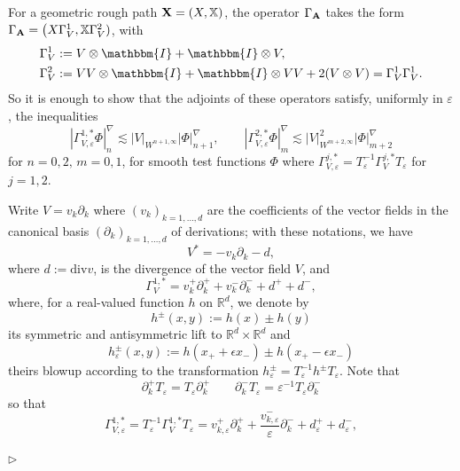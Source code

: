 \documentclass[11pt,a4paper]{amsart}
\newcommand{\RR}{\mathbb{R}}  \newcommand{\CC}{\mathbb{C}}  \newcommand{\LL}{\mathbb{L}}  \newcommand{\WW}{\mathbb{W}}
\newcommand{\bbX}{\mathbb{X}}
\newcommand{\ssk}{\smallskip}
\numberwithin{equation}{section} %
\newenvironment{Dem}{%
    \begin{list}{\hspace{0.5cm}{\sc Proof --}}{%
        \setlength{\topsep}{0pt}%
        \setlength{\leftmargin}{0pt}%
        \setlength{\rightmargin}{0pt}%
        \setlength{\listparindent}{0pt}%
        \setlength{\itemindent}{0pt}%
        \setlength{\parsep}{0pt}%
        \addtolength{\leftmargin}{20pt}%
        \addtolength{\rightmargin}{0pt}%
    } \item }{\hfill{\space $\rhd$}\end{list}\smallskip}
\begin{document}
\begin{Dem}
For a  geometric rough path $\bfX = (X,\bbX)$, the operator $\Gamma_{\bf A}$ takes the form $\Gamma_{\bfA} = \big(X  \Gamma_{V}^{1}, \bbX \Gamma_{V}^{2})$, with
\begin{equation*}
\begin{split}
&\Gamma_{V}^{1} := V  \otimes \mathbbm{I}+\mathbbm{I} \otimes V, \\
&\Gamma_{V}^{2} := V V \otimes \mathbbm{I}+\mathbbm{I} \otimes V V + 2 (V \otimes V) = \Gamma_{V}^{1} \Gamma_{V}^{1}.
\end{split}
\end{equation*}
So  it is enough to show that the adjoints of these operators satisfy, uniformly in $\varepsilon$, the inequalities
\begin{equation}
\label{eq:est-gamma-v}
|\Gamma_{V,\varepsilon}^{1,\ast} \Phi|^\nabla_{n} \lesssim |V|_{W^{n+1,\infty}} |\Phi|^\nabla_{n+1},
\qquad
|\Gamma_{V,\varepsilon}^{2,\ast} \Phi|^\nabla_{m} \lesssim |V|_{W^{m+2,\infty}}^2 |\Phi|^\nabla_{m+2}
\end{equation}
for $n=0,2,\,m=0,1$, for smooth test functions $\Phi$ where $\Gamma_{V,\varepsilon}^{j,\ast} = T_\varepsilon^{-1} \Gamma_{V}^{j,\ast}T_\varepsilon $ for $j=1,2$.

\ssk

Write $V = v_k \partial_k$ where $(v_k)_{k=1,\dots,d}$ are the coefficients of the vector fields in the canonical basis $(\partial_k)_{k=1,\dots,d}$ of derivations; with these notations, we have
$$
V^\ast = - v_k \partial_k - d,
$$ 
where $d := \textrm{div} v$, is the divergence of the vector field $V$, and
$$
\Gamma_{V}^{1,\ast} = v^+_k \partial^+_k + v^-_k \partial^-_k + d^+ + d^-,
$$  
where, for a real-valued function $h$ on $\RR^d$, we denote by
$$
h^\pm(x,y) := h(x) \pm h(y)
$$ 
its symmetric and antisymmetric lift to $\RR^d \times \RR^d$ and
$$
h^\pm_\varepsilon(x,y) := h(x_+ +\epsilon x_-) \pm h(x_+ -\epsilon x_-)
$$ 
theirs blowup according to the transformation $h^\pm_\varepsilon = T_\varepsilon^{-1} h^\pm T_\varepsilon$.
Note that
$$
\partial^+_k T_\varepsilon = T_\varepsilon \partial^+_k
\qquad
\partial^-_k T_\varepsilon = \varepsilon^{-1} T_\varepsilon \partial^-_k
$$
so that
$$
\Gamma_{V,\varepsilon}^{1,\ast} = T_\varepsilon^{-1} \Gamma_{V}^{1,\ast}T_\varepsilon = v^+_{k,\varepsilon} \partial^+_k +\frac{ v^-_{k,\varepsilon}}{\varepsilon} \partial^-_k + d^+_\varepsilon + d^-_\varepsilon,
$$  



\end{Dem}
\end{document}
